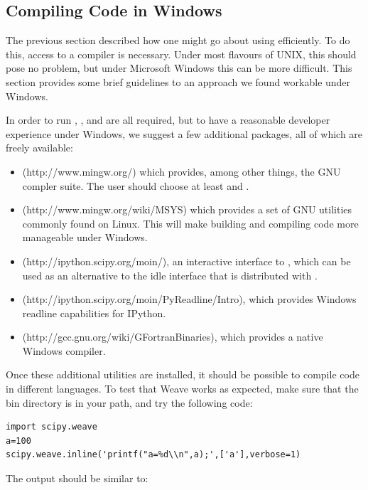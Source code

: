 \documentclass[article]{jss}
\begin{document}
\subsection{Compiling Code in Windows}
\label{CompilingWindows}

The previous section described how one might go about using
 efficiently. To do this, access to a compiler is
necessary. Under most flavours of UNIX, this should pose no problem,
but under Microsoft Windows this can be more difficult. This section
provides some brief guidelines to an approach we found workable under
Windows.

In order to run , ,  and  are all required,
but to have a reasonable developer experience under Windows, we suggest
a few additional packages, all of which are freely available:
\begin{itemize}
\item {} (http://www.mingw.org/) which provides, among other
  things, the GNU compler suite. The user should choose at least
   and .
\item {} (http://www.mingw.org/wiki/MSYS) which provides a set of
  GNU utilities commonly found on Linux. This will make building and
  compiling code more manageable under Windows.
\item {} (http://ipython.scipy.org/moin/), an interactive
  interface to , which can be used as an alternative
  to the idle interface that is distributed with .
\item {} (http://ipython.scipy.org/moin/PyReadline/Intro),
  which provides Windows readline capabilities for IPython.
\item {} (http://gcc.gnu.org/wiki/GFortranBinaries), which provides a
  native Windows  compiler.
\end{itemize}
Once these additional utilities are installed, it should be possible
to compile code in different languages. To test that Weave works as
expected, make sure that the  bin directory is in your path, and
try the following code:


\begin{lstlisting}[basicstyle={\scriptsize}]
import scipy.weave 
a=100 
scipy.weave.inline('printf("a=%d\\n",a);',['a'],verbose=1)
\end{lstlisting}


The output should be similar to:
\end{document}
